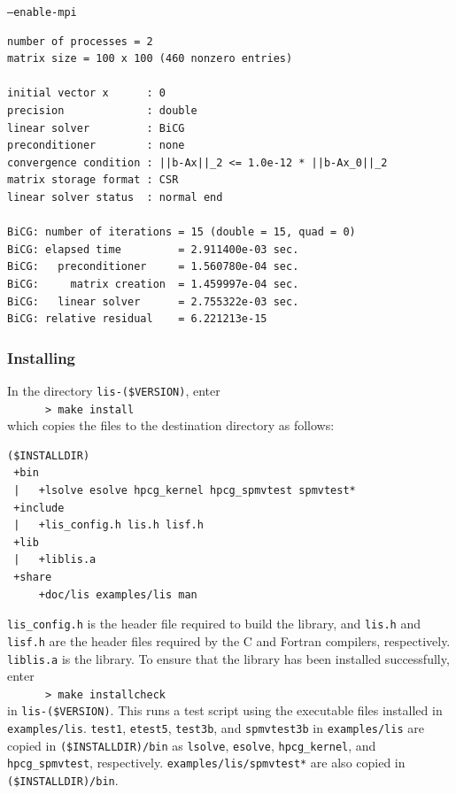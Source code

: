 \documentclass[a4paper]{article}
\begin{document}
\begin{itemsquarebox}[l]{\tt --enable-mpi}
 \begin{minipage}{10cm}
 \begin{verbatim}
number of processes = 2
matrix size = 100 x 100 (460 nonzero entries)

initial vector x      : 0
precision             : double
linear solver         : BiCG
preconditioner        : none
convergence condition : ||b-Ax||_2 <= 1.0e-12 * ||b-Ax_0||_2
matrix storage format : CSR
linear solver status  : normal end

BiCG: number of iterations = 15 (double = 15, quad = 0)
BiCG: elapsed time         = 2.911400e-03 sec.
BiCG:   preconditioner     = 1.560780e-04 sec. 
BiCG:     matrix creation  = 1.459997e-04 sec.
BiCG:   linear solver      = 2.755322e-03 sec.
BiCG: relative residual    = 6.221213e-15
 \end{verbatim}
 \end{minipage}
\end{itemsquarebox}

\subsubsection{Installing}
In the directory {\tt lis-(\$VERSION)}, enter\\
 \verb+      > make install+\\
which copies the files to the destination directory as follows:

\begin{verbatim}
($INSTALLDIR)
 +bin
 |   +lsolve esolve hpcg_kernel hpcg_spmvtest spmvtest*
 +include
 |   +lis_config.h lis.h lisf.h
 +lib
 |   +liblis.a
 +share
     +doc/lis examples/lis man
\end{verbatim}

{\tt lis\_config.h} is the header file required to build the library, and 
{\tt lis.h} and {\tt lisf.h} are the header files required 
by the C and Fortran compilers, respectively. 
{\tt liblis.a} is the library.
To ensure that the library has been installed successfully, enter\\
 \verb+      > make installcheck+\\
in {\tt lis-(\$VERSION)}.
This runs a test script using the executable files installed 
in {\tt examples/lis}. 
{\tt test1}, {\tt etest5}, {\tt test3b}, and {\tt spmvtest3b} 
in {\tt examples/lis} 
are copied in {\tt (\$INSTALLDIR)/bin} as {\tt lsolve}, {\tt esolve}, 
{\tt hpcg\_kernel}, and {\tt hpcg\_spmvtest}, respectively.
{\tt examples/lis/spmvtest*} are also copied in \\
{\tt (\$INSTALLDIR)/bin}.
\end{document}
